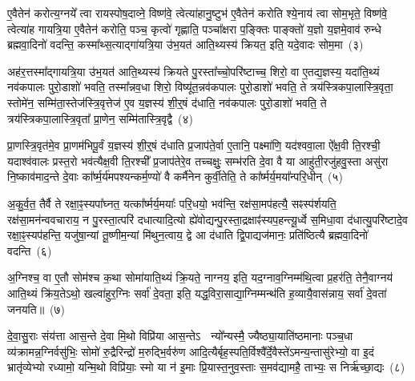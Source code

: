 ए॒वैतेन॑ करोत्य॒ग्नये᳚ त्वा रायस्पोष॒दाव्ने॒ विष्ण॑वे॒ त्वेत्या॑हानु॒ष्टुभ॑ ए॒वैतेन॑ करोति श्ये॒नाय॑ त्वा सोम॒भृते॒ विष्ण॑वे॒ त्वेत्या॑ह गायत्रि॒या ए॒वैतेन॑ करोति॒ पञ्च॒ कृत्वो॑ गृह्णाति॒ पञ्चा᳚क्षरा प॒ङ्क्तिः पाङ्क्तो॑ य॒ज्ञो य॒ज्ञमे॒वाव॑ रुन्धे ब्रह्मवा॒दिनो॑ वदन्ति॒ कस्मा᳚थ्स॒त्याद्गा॑यत्रि॒या उ॑भ॒यत॑ आति॒थ्यस्य॑ क्रियत॒ इति॒ यदे॒वादः सोम॒मा~(३)

अह॑र॒त्तस्मा᳚द्गायत्रि॒या उ॑भ॒यत॑ आति॒थ्यस्य॑ क्रियते पु॒रस्ता᳚च्चो॒परि॑ष्टाच्च॒ शिरो॒ वा ए॒तद्य॒ज्ञस्य॒ यदा॑ति॒थ्यं नव॑कपालः पुरो॒डाशो॑ भवति॒ तस्मा᳚न्नव॒धा शिरो॒ विष्यू॑त॒न्नव॑कपालः पुरो॒डाशो॑ भवति॒ ते त्रय॑स्त्रिकपा॒लास्त्रि॒वृता॒ स्तोमे॑न॒ सम्मि॑ता॒स्तेज॑स्त्रि॒वृत्तेज॑ ए॒व य॒ज्ञस्य॑ शी॒र्॒\mbox{}षं द॑धाति॒ नव॑कपालः पुरो॒डाशो॑ भवति॒ ते त्रय॑स्त्रिकपा॒लास्त्रि॒वृता᳚ प्रा॒णेन॒ सम्मि॑तास्त्रि॒वृद्वै~(४)

प्रा॒णस्त्रि॒वृत॑मे॒व प्रा॒णम॑भिपू॒र्वं य॒ज्ञस्य॑ शी॒र्॒\mbox{}षं द॑धाति प्र॒जाप॑ते॒र्वा ए॒तानि॒ पक्ष्मा॑णि॒ यद॑श्ववा॒ला ऐ᳚क्ष॒वी ति॒रश्ची॒ यदाश्व॑वालः प्रस्त॒रो भव॑त्यैक्ष॒वी ति॒रश्ची᳚ प्र॒जाप॑तेरे॒व तच्चक्षुः॒ सम्भ॑रति दे॒वा वै या आहु॑ती॒रजु॑हवु॒स्ता असु॑रा नि॒ष्काव॑माद॒न्ते दे॒वाः का᳚र्\mbox{}ष्म॒र्य॑मपश्यन्कर्म॒ण्यो॑ वै कर्मै॑नेन कुर्वी॒तेति॒ ते का᳚र्ष्मर्य॒मया᳚न्परि॒धीन्~(५)

अ॒कु॒र्व॒त॒ तैर्वै ते रक्षा॒ꣴ॒स्यपा᳚घ्नत॒ यत्का᳚र्ष्मर्य॒मयाः᳚ परि॒धयो॒ भव॑न्ति॒ रक्ष॑सा॒मप॑हत्यै॒ सꣴस्प॑र्शयति॒ रक्ष॑सा॒मन॑न्ववचाराय॒ न पु॒रस्ता॒त्परि॑ दधात्यादि॒त्यो ह्ये॑वोद्यन्पु॒रस्ता॒द्रक्षाꣴ॑स्यप॒हन्त्यू॒र्ध्वे स॒मिधा॒वा द॑धात्यु॒परि॑ष्टादे॒व रक्षा॒ꣴ॒स्यप॑हन्ति॒ यजु॑षा॒न्यां तू॒ष्णीम॒न्यां मि॑थुन॒त्वाय॒ द्वे आ द॑धाति द्वि॒पाद्यज॑मानः॒ प्रति॑ष्ठित्यै ब्रह्मवा॒दिनो॑ वदन्ति~(६)

अ॒ग्निश्च॒ वा ए॒तौ सोम॑श्च क॒था सोमा॑याति॒थ्यं क्रि॒यते॒ नाग्नय॒ इति॒ यद॒ग्नाव॒ग्निम्म॑थि॒त्वा प्र॒हर॑ति॒ तेनै॒वाग्नय॑ आति॒थ्यं क्रि॑य॒ते\-ऽथो॒ खल्वा॑हुर॒ग्निः सर्वा॑ दे॒वता॒ इति॒ यद्ध॒विरा॒साद्या॒ग्निम्मन्थ॑ति ह॒व्यायै॒वास॑न्नाय॒ सर्वा॑ दे॒वता॑ जनयति॥~(७)

{\anuvakamend[{पत्नि॑या ए॒व जग॑त्या॒ आ त्रि॒वृद्वै प॑रि॒धीन् व॑द॒न्त्येक॑चत्वारिꣳशच्च}]}%

दे॒वा॒सु॒राः संय॑त्ता आस॒न्ते दे॒वा मि॒थो विप्रि॑या आस॒न्ते\-ऽ  न्यो᳚न्यस्मै॒ ज्यैष्ठ्या॒याति॑ष्ठमानाः पञ्च॒धा व्य॑क्रामन्न॒ग्नि\-र्वसु॑भिः॒ सोमो॑ रु॒द्रैरिन्द्रो॑ म॒रुद्भि॒र्वरु॑ण आदि॒त्यैर्बृह॒स्पति॒र्विश्वै᳚र्दे॒वैस्ते॑\-ऽमन्य॒न्तासु॑रेभ्यो॒ वा इ॒दं भ्रातृ॑व्येभ्यो रध्यामो॒ यन्मि॒थो विप्रि॑याः॒ स्मो या न॑ इ॒माः प्रि॒यास्त॒नुव॒स्ताः स॒मव॑द्यामहै॒ ताभ्यः॒ स निर्\mbox{}ऋ॑च्छा॒द्यः~(८)

